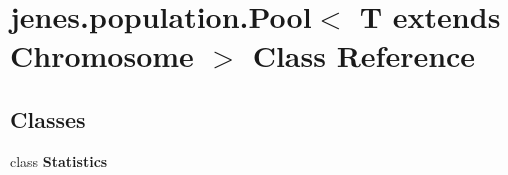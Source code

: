 \hypertarget{classjenes_1_1population_1_1_pool_3_01_t_01extends_01_chromosome_01_4}{\section{jenes.\-population.\-Pool$<$ T extends Chromosome $>$ Class Reference}
\label{classjenes_1_1population_1_1_pool_3_01_t_01extends_01_chromosome_01_4}
}
\subsection*{Classes}
\begin{DoxyCompactItemize}
\item 
class {\bfseries Statistics}
\end{DoxyCompactItemize}
